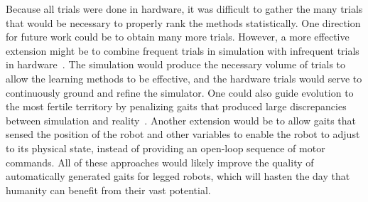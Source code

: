 
Because all trials were done in hardware, it was difficult to gather
the many trials that would be necessary to properly rank the methods statistically.
One direction for future work could be to obtain many more trials. However, a more effective extension might be to combine frequent trials in
simulation with infrequent trials in hardware~\citep{bongard}.  The simulation would produce the
necessary volume of trials to allow the learning methods to be
effective, and the hardware trials would serve to continuously ground
and refine the simulator.  One could also guide evolution to the most
fertile territory by penalizing gaits that produced large
discrepancies between simulation and reality~\citep{koos2010crossing}. Another extension would be to allow gaits that sensed the position of the robot and other variables to enable the robot to adjust to its physical state, instead of providing an open-loop sequence of motor commands. All of these approaches would likely improve the quality of automatically generated gaits for legged robots, which will hasten the day that humanity can benefit from their vast potential. 

